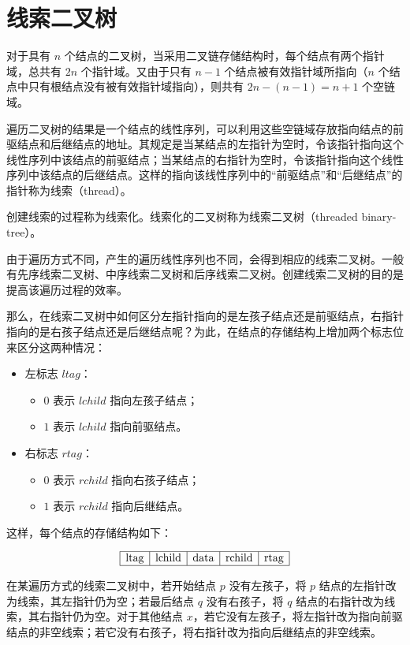 \documentclass[lang=cn,newtx,10pt,scheme=chinese]{elegantbook}
\begin{document}
\section{线索二叉树}

对于具有 $n$ 个结点的二叉树，当采用二叉链存储结构时，每个结点有两个指针域，总共有 $2n$ 个指针域。又由于只有 $n-1$ 个结点被有效指针域所指向（$n$ 个结点中只有根结点没有被有效指针域指向），则共有 $2n - (n-1) = n+1$ 个空链域。

遍历二叉树的结果是一个结点的线性序列，可以利用这些空链域存放指向结点的前驱结点和后继结点的地址。其规定是当某结点的左指针为空时，令该指针指向这个线性序列中该结点的前驱结点；当某结点的右指针为空时，令该指针指向这个线性序列中该结点的后继结点。这样的指向该线性序列中的“前驱结点”和“后继结点”的指针称为线索（thread）。

创建线索的过程称为线索化。线索化的二叉树称为线索二叉树（threaded binary-tree）。

由于遍历方式不同，产生的遍历线性序列也不同，会得到相应的线索二叉树。一般有先序线索二叉树、中序线索二叉树和后序线索二叉树。创建线索二叉树的目的是提高该遍历过程的效率。

那么，在线索二叉树中如何区分左指针指向的是左孩子结点还是前驱结点，右指针指向的是右孩子结点还是后继结点呢？为此，在结点的存储结构上增加两个标志位来区分这两种情况：

\begin{itemize}
  \item 左标志 $ltag$：
  \begin{itemize}
    \item $0$ 表示 $lchild$ 指向左孩子结点；
    \item $1$ 表示 $lchild$ 指向前驱结点。
  \end{itemize}
  \item 右标志 $rtag$：
  \begin{itemize}
    \item $0$ 表示 $rchild$ 指向右孩子结点；
    \item $1$ 表示 $rchild$ 指向后继结点。
  \end{itemize}
\end{itemize}

这样，每个结点的存储结构如下：

\[
\begin{array}{|c|c|c|c|c|}
\hline
\text{ltag} & \text{lchild} & \text{data} & \text{rchild} & \text{rtag} \\
\hline
\end{array}
\]

在某遍历方式的线索二叉树中，若开始结点 $p$ 没有左孩子，将 $p$ 结点的左指针改为线索，其左指针仍为空；若最后结点 $q$ 没有右孩子，将 $q$ 结点的右指针改为线索，其右指针仍为空。对于其他结点 $x$，若它没有左孩子，将左指针改为指向前驱结点的非空线索；若它没有右孩子，将右指针改为指向后继结点的非空线索。
\end{document}
